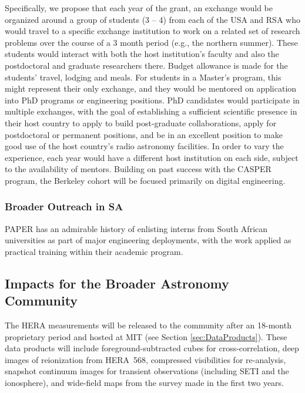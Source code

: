 \documentclass[preprint]{aastex}
\begin{document}
Specifically, we propose that each year of the grant, an exchange would be organized around a group of students (3 – 4) from each of the USA and RSA who would travel to a specific exchange institution to work on a related set of research problems over the course of a 3 month period (e.g., the northern summer).  These students would interact with both the host institution’s faculty and also the postdoctoral and graduate researchers there.  Budget allowance is made for the students' travel, lodging and meals.  For students in a Master’s program, this might represent their only exchange, and they would be mentored on application into PhD programs or engineering positions.  PhD candidates would participate in multiple exchanges, with the goal of establishing a sufficient scientific presence in their host country to apply to build post-graduate collaborations, apply for postdoctoral or permanent positions, and be in an excellent position to make good use of the host country’s radio astronomy facilities.  In order to vary the experience, each year would have a different host institution on each side, subject to the availability of mentors.  Building on past success with the CASPER program, the Berkeley cohort will be focused primarily on digital engineering.  

\subsubsection{Broader Outreach in SA}

PAPER has an admirable history of enlisting interns from South African universities as part of major engineering deployments, with the work applied as practical training within their academic program.

\subsection{Impacts for the Broader Astronomy Community}

The HERA measurements will be released to the community after an 18-month proprietary period and hosted at MIT (see Section \ref{sec:DataProducts}).  These data products will include foreground-subtracted cubes for
cross-correlation, deep images of reionization from HERA~568, compressed visibilities for re-analysis, snapshot continuum images for transient observations (including SETI and the ionosphere), and wide-field maps from the survey made in the first two years.
\end{document}
